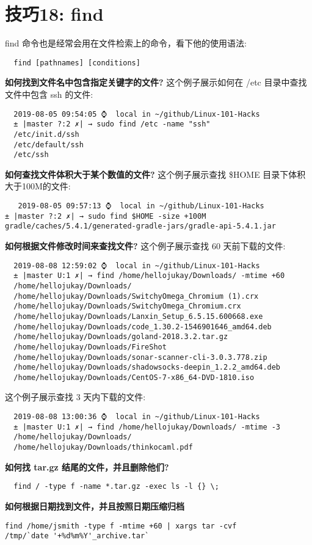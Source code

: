 \documentclass[UTF8]{ctexart}
\begin{document}
\section*{技巧18: find}
find 命令也是经常会用在文件检索上的命令，看下他的使用语法:
\begin{lstlisting}
  find [pathnames] [conditions]
\end{lstlisting}
\textbf{如何找到文件名中包含指定关键字的文件?}\newline
这个例子展示如何在 /etc 目录中查找文件中包含 ssh 的文件:
\begin{lstlisting}
  2019-08-05 09:54:05 ⌚  local in ~/github/Linux-101-Hacks
  ± |master ?:2 ✗| → sudo find /etc -name "ssh"
  /etc/init.d/ssh
  /etc/default/ssh
  /etc/ssh  
\end{lstlisting}
\textbf{如何查找文件体积大于某个数值的文件?}\newline
这个例子展示查找 \$HOME 目录下体积大于100M的文件:
\begin{lstlisting}
   2019-08-05 09:57:13 ⌚  local in ~/github/Linux-101-Hacks
± |master ?:2 ✗| → sudo find $HOME -size +100M
gradle/caches/5.4.1/generated-gradle-jars/gradle-api-5.4.1.jar
\end{lstlisting}
\textbf{如何根据文件修改时间来查找文件?}\newline
这个例子展示查找 60 天前下载的文件:
\begin{lstlisting}
  2019-08-08 12:59:02 ⌚  local in ~/github/Linux-101-Hacks
  ± |master U:1 ✗| → find /home/hellojukay/Downloads/ -mtime +60
  /home/hellojukay/Downloads/
  /home/hellojukay/Downloads/SwitchyOmega_Chromium (1).crx
  /home/hellojukay/Downloads/SwitchyOmega_Chromium.crx
  /home/hellojukay/Downloads/Lanxin_Setup_6.5.15.600668.exe
  /home/hellojukay/Downloads/code_1.30.2-1546901646_amd64.deb
  /home/hellojukay/Downloads/goland-2018.3.2.tar.gz
  /home/hellojukay/Downloads/FireShot
  /home/hellojukay/Downloads/sonar-scanner-cli-3.0.3.778.zip
  /home/hellojukay/Downloads/shadowsocks-deepin_1.2.2_amd64.deb
  /home/hellojukay/Downloads/CentOS-7-x86_64-DVD-1810.iso  
\end{lstlisting}
这个例子展示查找 3 天内下载的文件:
\begin{lstlisting}
  2019-08-08 13:00:36 ⌚  local in ~/github/Linux-101-Hacks
  ± |master U:1 ✗| → find /home/hellojukay/Downloads/ -mtime -3
  /home/hellojukay/Downloads/
  /home/hellojukay/Downloads/thinkocaml.pdf  
\end{lstlisting}
\textbf{如何找 tar.gz 结尾的文件，并且删除他们?}
\begin{lstlisting}
  find / -type f -name *.tar.gz -exec ls -l {} \;
\end{lstlisting}
\textbf{如何根据日期找到文件，并且按照日期压缩归档}
\begin{lstlisting}
find /home/jsmith -type f -mtime +60 | xargs tar -cvf
/tmp/`date '+%d%m%Y'_archive.tar`
\end{lstlisting}
\end{document}
